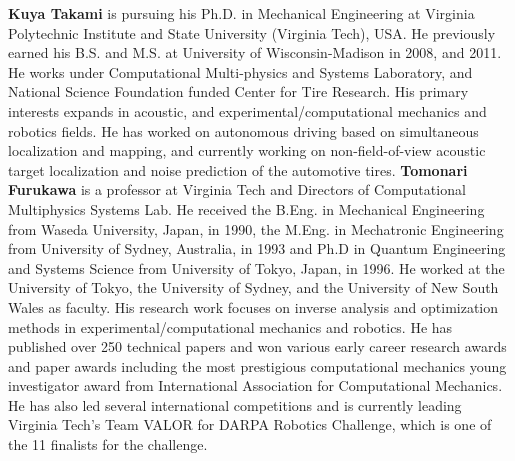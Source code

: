 \noindent\textbf{Kuya Takami} is pursuing his Ph.D. in Mechanical Engineering at Virginia Polytechnic Institute and State University (Virginia Tech), USA. He previously earned his B.S. and M.S. at University of Wisconsin-Madison in 2008, and 2011. He works under Computational Multi-physics and Systems Laboratory, and National Science Foundation funded Center for Tire Research. His primary interests expands in acoustic, and experimental/computational mechanics and robotics fields. He has worked on autonomous driving based on simultaneous localization and mapping, and currently working on non-field-of-view acoustic target localization and noise prediction of the automotive tires.
\noindent\textbf{Tomonari Furukawa} is a professor at Virginia Tech and Directors of Computational Multiphysics Systems Lab. He received the B.Eng. in Mechanical Engineering from Waseda University, Japan, in 1990, the M.Eng. in Mechatronic Engineering from University of Sydney, Australia, in 1993 and Ph.D in Quantum Engineering and Systems Science from University of Tokyo, Japan, in 1996.  He worked at the University of Tokyo, the University of Sydney, and the University of New South Wales as faculty. His research work focuses on inverse analysis and optimization methods in experimental/computational mechanics and \linebreak[4]robotics.  He has published over 250 technical papers and won various early career research awards and paper awards including the most prestigious computational mechanics young investigator award from International Association for Computational Mechanics.  He has also led several international competitions and is currently leading Virginia Tech’s Team VALOR for DARPA Robotics Challenge, which is one of the 11 finalists for the challenge.  


